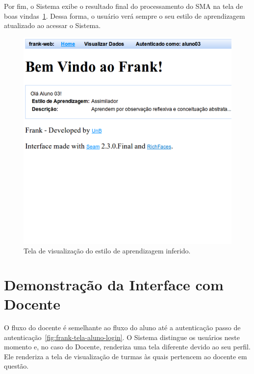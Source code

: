 Por fim, o Sistema exibe o resultado final do processamento do SMA na tela de boas vindas~\ref{fig:frank-tela-aluno-inferencia-estilo}. Dessa forma, o usuário verá sempre o seu estilo de aprendizagem atualizado ao acessar o Sistema.

\begin{figure}
	\centering
	\includegraphics[scale=0.48]{images/frank-tela-aluno-inferencia-estilo.png}
	\caption{Tela de visualização do estilo de aprendizagem inferido.}
	\label{fig:frank-tela-aluno-inferencia-estilo}
\end{figure}

\section{Demonstração da Interface com Docente}\label{section:interface-docente}
O fluxo do docente é semelhante ao fluxo do aluno até a autenticação passo de autenticação~\ref{fig:frank-tela-aluno-login}. O Sistema distingue os usuários neste momento e, no caso do Docente, renderiza uma tela diferente devido ao seu perfil. Ele renderiza a tela de visualização de turmas às quais pertencem ao docente em questão.

